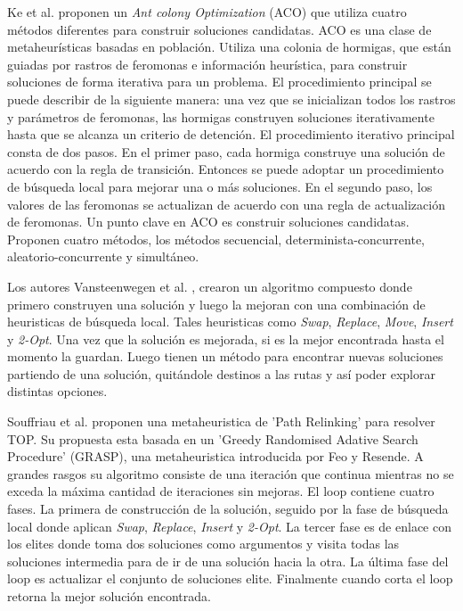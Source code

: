 \bigskip

Ke et al. \cite{KeArchettiFeng} proponen un \textit{Ant colony Optimization} (ACO) que utiliza cuatro métodos diferentes para construir soluciones candidatas. ACO es una clase de metaheurísticas basadas en población. Utiliza una colonia de hormigas, que están guiadas por rastros de feromonas e información heurística, para construir soluciones de forma iterativa para un problema. El procedimiento principal se puede describir de la siguiente manera: una vez que se inicializan todos los rastros y parámetros de feromonas, las hormigas construyen soluciones iterativamente hasta que se alcanza un criterio de detención. El procedimiento iterativo principal consta de dos pasos. En el primer paso, cada hormiga construye una solución de acuerdo con la regla de transición. Entonces se puede adoptar un procedimiento de búsqueda local para mejorar una o más soluciones. En el segundo paso, los valores de las feromonas se actualizan de acuerdo con una regla de actualización de feromonas. Un punto clave en ACO es construir soluciones candidatas. Proponen cuatro métodos, los métodos secuencial, determinista-concurrente, aleatorio-concurrente y simultáneo.

\bigskip

Los autores Vansteenwegen et al. \cite{VansteenwegenSouffriauBergheOudheusden}, crearon un algoritmo compuesto donde primero construyen una solución y luego la mejoran con una combinación de heuristicas de búsqueda local. Tales heuristicas como \textit{Swap}, \textit{Replace}, \textit{Move}, \textit{Insert} y \textit{2-Opt}. Una vez que la solución es mejorada, si es la mejor encontrada hasta el momento la guardan. Luego tienen un método para encontrar nuevas soluciones partiendo de una solución, quitándole destinos a las rutas y así poder explorar distintas opciones.

\bigskip

Souffriau et al. \cite{SouffriauVansteenwegenBergheOudheusden} proponen una metaheuristica de 'Path Relinking' para resolver TOP. Su propuesta esta basada en un 'Greedy Randomised Adative Search Procedure' (GRASP), una metaheuristica introducida por Feo y Resende. A grandes rasgos su algoritmo consiste de una iteración que continua mientras no se exceda la máxima cantidad de iteraciones sin mejoras. El loop contiene cuatro fases. La primera de construcción de la solución, seguido por la fase de búsqueda local donde aplican \textit{Swap}, \textit{Replace}, \textit{Insert} y \textit{2-Opt}. La tercer fase es de enlace con los elites donde toma dos soluciones como argumentos y visita todas las soluciones intermedia para de ir de una solución hacia la otra. La última fase del loop es actualizar el conjunto de soluciones elite. Finalmente cuando corta el loop retorna la mejor solución encontrada.

